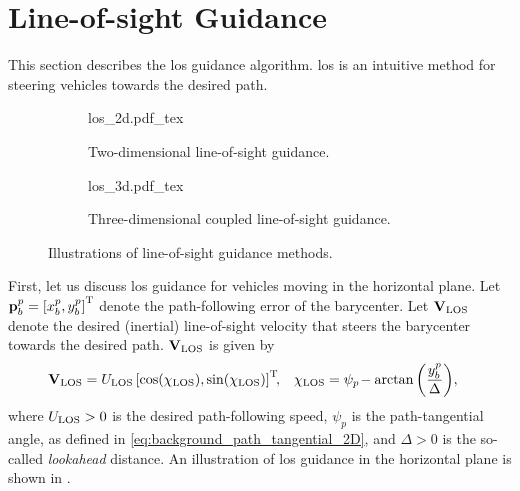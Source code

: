 \section{Line-of-sight Guidance}
\label{sec:background_LOS}

This section describes the \gls{los} guidance algorithm.
\gls{los} is an intuitive method for steering vehicles towards the desired path.

\begin{figure}[b]
    \centering
    \begin{subfigure}{0.48\textwidth}
        \centering
        \def\svgwidth{0.9\textwidth}
        {los_2d.pdf_tex}
        \caption{Two-dimensional line-of-sight guidance.}
        \label{fig:background_los_2d}
    \end{subfigure}
    \begin{subfigure}{0.48\textwidth}
        \def\svgwidth{\textwidth}
        {los_3d.pdf_tex}
        \caption{Three-dimensional coupled line-of-sight guidance.}
        \label{fig:background_los_3d}
    \end{subfigure}
    \caption{Illustrations of line-of-sight guidance methods.}
\end{figure}

First, let us discuss \gls{los} guidance for vehicles moving in the horizontal plane.
Let $\mathbf{p}_b^p = \left[x_b^p, y_b^p\right]^{\mathrm{T}}$ denote the path-following error of the barycenter.
Let $\mathbf{V}_{\rm LOS}$ denote the desired (inertial) line-of-sight velocity that steers the barycenter towards the desired path.
$\mathbf{V}_{\rm LOS}$ is given by
\begin{align}
    \mathbf{V}_{\rm LOS} &= U_{\rm LOS} \left[\cos(\chi_{\rm LOS}), \sin(\chi_{\rm LOS})\right]^{\mathrm{T}}\!\!, &
    \chi_{\rm LOS} &= \psi_{p\!} - \arctan\left(\frac{y_b^p}{\Delta}\right)\!,
    \label{eq:background_los_2d}
\end{align}
where $U_{\rm LOS} > 0$ is the desired path-following speed, $\psi_p$ is the path-tangential angle, as defined in \eqref{eq:background_path_tangential_2D}, and $\Delta > 0$ is the so-called \emph{lookahead} distance.
An illustration of \gls{los} guidance in the horizontal plane is shown in .

